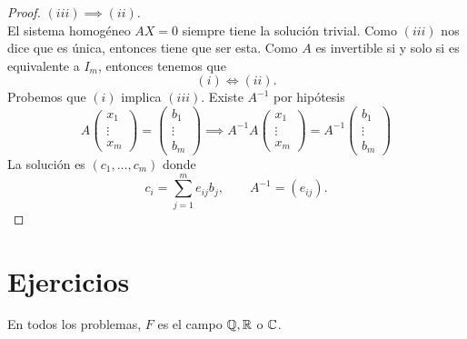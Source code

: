 \documentclass[12pt,a4paper]{book}
\begin{document}
    \begin{proof}
        $(iii)\implies (ii)$.\\
        El sistema homogéneo $AX=0$ siempre tiene la solución trivial. Como $(iii)$ nos
        dice que es única, entonces tiene que ser esta. Como $A$ es invertible si y solo si
        es equivalente a $I_{m}$, entonces tenemos que
        \begin{equation*}
            (i)\Longleftrightarrow(ii).
        \end{equation*}
        Probemos que $(i)$ implica $(iii)$. Existe $A^{-1}$ por hipótesis
        \begin{equation*}
            A
            \begin{pmatrix}
                x_{1}\\
                \vdots\\
                x_{m}
            \end{pmatrix}
            =
            \begin{pmatrix}
                b_{1}\\
                \vdots\\
                b_{m}
            \end{pmatrix}
            \implies A^{-1}A
            \begin{pmatrix}
                x_{1}\\
                \vdots\\
                x_{m}
            \end{pmatrix}
            =A^{-1}
            \begin{pmatrix}
                b_{1}\\
                \vdots\\
                b_{m}
            \end{pmatrix}
        \end{equation*}
        La solución es $(c_{1},\dots,c_{m})$ donde
        \begin{equation*}
            c_{i}=\sum_{j=1}^{m}e_{ij}b_{j},\qquad A^{-1}=(e_{ij}).
        \end{equation*}
    \end{proof}

    \section{Ejercicios}

    En todos los problemas, $F$ es el campo $\mathbb{Q}, \mathbb{R}$ o $\mathbb{C}$.
\end{document}
